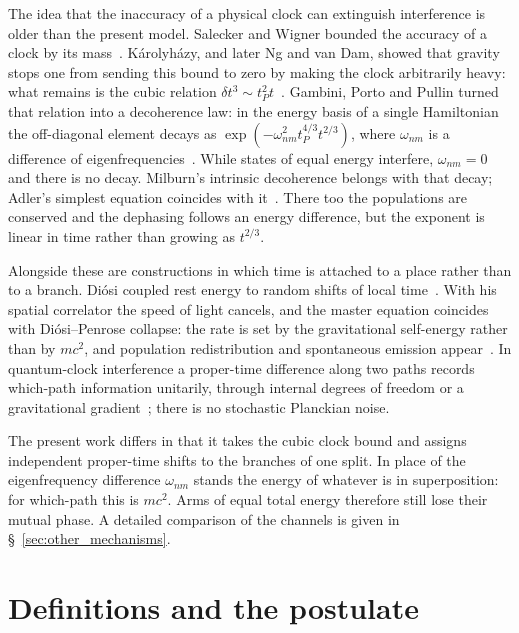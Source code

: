\documentclass[11pt,a4paper]{article}
\begin{document}
The idea that the inaccuracy of a physical clock can extinguish interference is older than the present model. Salecker and Wigner bounded the accuracy of a clock by its mass~\cite{saleckerwigner}. K\'arolyh\'azy, and later Ng and van Dam, showed that gravity stops one from sending this bound to zero by making the clock arbitrarily heavy: what remains is the cubic relation $\delta t^3\sim t_P^2 t$~\cite{karolyhazy1966,ngvandam1995,ngvandam1994}. Gambini, Porto and Pullin turned that relation into a decoherence law: in the energy basis of a single Hamiltonian the off-diagonal element decays as $\exp(-\omega_{nm}^2 t_P^{4/3}t^{2/3})$, where $\omega_{nm}$ is a difference of eigenfrequencies~\cite{gambini2004,gambini2007}. While states of equal energy interfere, $\omega_{nm}=0$ and there is no decay. Milburn's intrinsic decoherence belongs with that decay; Adler's simplest equation coincides with it~\cite{milburn1991,adler2004,diosi2005}. There too the populations are conserved and the dephasing follows an energy difference, but the exponent is linear in time rather than growing as $t^{2/3}$.

Alongside these are constructions in which time is attached to a place rather than to a branch. Di\'osi coupled rest energy to random shifts of local time~\cite{diosi2005}. With his spatial correlator the speed of light cancels, and the master equation coincides with Di\'osi--Penrose collapse: the rate is set by the gravitational self-energy rather than by $mc^2$, and population redistribution and spontaneous emission appear~\cite{donadi2021}. In quantum-clock interference a proper-time difference along two paths records which-path information unitarily, through internal degrees of freedom or a gravitational gradient~\cite{zych2011proper,pikovski2015}; there is no stochastic Planckian noise.

The present work differs in that it takes the cubic clock bound and assigns independent proper-time shifts to the branches of one split. In place of the eigenfrequency difference $\omega_{nm}$ stands the energy of whatever is in superposition: for which-path this is $mc^2$. Arms of equal total energy therefore still lose their mutual phase. A detailed comparison of the channels is given in \S~\ref{sec:other_mechanisms}.

\section{Definitions and the postulate}\label{sec:postulates}
\end{document}

